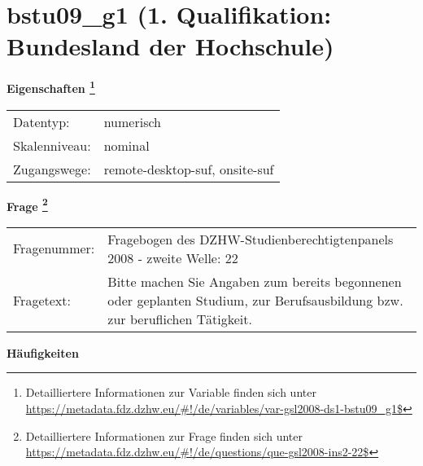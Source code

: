 
    \setcounter{footnote}{0}

    \vspace*{-1.8cm}
	\section{bstu09\_g1 (1. Qualifikation: Bundesland der Hochschule)}
	\label{section:bstu09_g1}



    \vspace*{0.5cm}
    \noindent\textbf{Eigenschaften
	\footnote{Detailliertere Informationen zur Variable finden sich unter
		\url{https://metadata.fdz.dzhw.eu/\#!/de/variables/var-gsl2008-ds1-bstu09_g1$}}}\\
	\begin{tabularx}{\hsize}{@{}lX}
	Datentyp: & numerisch \\
	Skalenniveau: & nominal \\
	Zugangswege: &
	  remote-desktop-suf, 
	  onsite-suf
 \\
    \end{tabularx}



				\vspace*{0.5cm}
                \noindent\textbf{Frage
	                \footnote{Detailliertere Informationen zur Frage finden sich unter
		              \url{https://metadata.fdz.dzhw.eu/\#!/de/questions/que-gsl2008-ins2-22$}}}\\
				\begin{tabularx}{\hsize}{@{}lX}
					Fragenummer: &
					  Fragebogen des DZHW-Studienberechtigtenpanels 2008 - zweite Welle:
					  22
 \\
					Fragetext: & Bitte machen Sie Angaben zum bereits begonnenen oder geplanten Studium, zur Berufsausbildung bzw. zur beruflichen Tätigkeit. \\
				\end{tabularx}





        		\vspace*{0.5cm}
                \noindent\textbf{Häufigkeiten}

